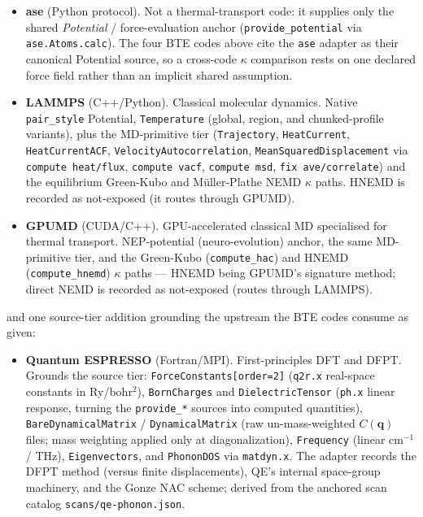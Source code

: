 \documentclass[11pt,a4paper]{article}
\begin{document}
\begin{itemize}[leftmargin=2em]
  \item \textbf{ase} (Python protocol). Not a thermal-transport code: it supplies
        only the shared \emph{Potential} / force-evaluation anchor
        (\texttt{provide\_potential} via \texttt{ase.Atoms.calc}). The four BTE
        codes above cite the \texttt{ase} adapter as their canonical Potential
        source, so a cross-code $\kappa$ comparison rests on one declared force
        field rather than an implicit shared assumption.
  \item \textbf{LAMMPS} (C++/Python). Classical molecular dynamics. Native
        \texttt{pair\_style} Potential, \texttt{Temperature} (global,
        region, and chunked-profile variants), plus the MD-primitive tier
        (\texttt{Trajectory}, \texttt{HeatCurrent}, \texttt{HeatCurrentACF},
        \texttt{VelocityAutocorrelation}, \texttt{MeanSquaredDisplacement} via
        \texttt{compute heat/flux}, \texttt{compute vacf}, \texttt{compute msd},
        \texttt{fix ave/correlate}) and the equilibrium Green-Kubo and
        Müller-Plathe NEMD $\kappa$ paths. HNEMD is recorded as not-exposed
        (it routes through GPUMD).
  \item \textbf{GPUMD} (CUDA/C++). GPU-accelerated classical MD specialised for
        thermal transport. NEP-potential (neuro-evolution) anchor, the same
        MD-primitive tier, and the Green-Kubo (\texttt{compute\_hac}) and
        HNEMD (\texttt{compute\_hnemd}) $\kappa$ paths --- HNEMD being GPUMD's
        signature method; direct NEMD is recorded as not-exposed (routes
        through LAMMPS).
\end{itemize}

\noindent and one source-tier addition grounding the upstream the BTE codes
consume as given:

\begin{itemize}[leftmargin=2em]
  \item \textbf{Quantum ESPRESSO} (Fortran/MPI). First-principles DFT and
        DFPT. Grounds the source tier: \texttt{ForceConstants[order=2]}
        (\texttt{q2r.x} real-space constants in Ry/bohr$^2$),
        \texttt{BornCharges} and \texttt{DielectricTensor} (\texttt{ph.x}
        linear response, turning the \texttt{provide\_*} sources into
        computed quantities), \texttt{BareDynamicalMatrix} /
        \texttt{DynamicalMatrix} (raw un-mass-weighted $C(\mathbf{q})$
        files; mass weighting applied only at diagonalization),
        \texttt{Frequency} (linear cm$^{-1}$ / THz), \texttt{Eigenvectors},
        and \texttt{PhononDOS} via \texttt{matdyn.x}. The adapter records
        the DFPT method (versus finite displacements), QE's internal
        space-group machinery, and the Gonze NAC scheme; derived from the
        anchored scan catalog \texttt{scans/qe-phonon.json}.
\end{itemize}
\end{document}
